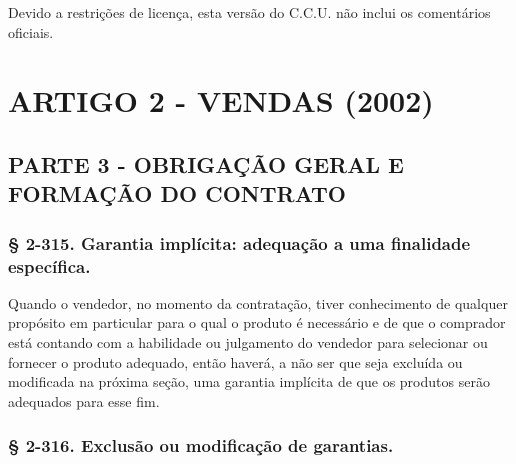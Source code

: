 \documentclass[a4paper, 12pt]{article}
\begin{document}
\vspace{5mm}

Devido a restrições de licença, esta versão do C.C.U. não inclui os comentários oficiais.

\pagebreak

\tableofcontents

\pagebreak

\section{ARTIGO 2 - VENDAS (2002)}

\subsection{PARTE 3 - OBRIGAÇÃO GERAL E FORMAÇÃO DO CONTRATO}

\subsubsection{§ 2-315. Garantia implícita: adequação a uma finalidade específica.}

Quando o vendedor, no momento da contratação, tiver conhecimento de qualquer propósito em particular para o qual o produto é necessário e de que o comprador está contando com a habilidade ou julgamento do vendedor para selecionar ou fornecer o produto adequado, então haverá, a não ser que seja excluída ou modificada na próxima seção, uma garantia implícita de que os produtos serão adequados para esse fim.

\subsubsection{§ 2-316. Exclusão ou modificação de garantias.}
\end{document}
